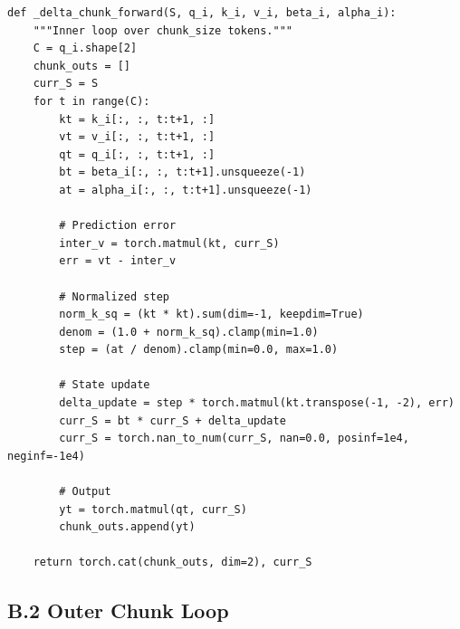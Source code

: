 \begin{lstlisting}
def _delta_chunk_forward(S, q_i, k_i, v_i, beta_i, alpha_i):
    """Inner loop over chunk_size tokens."""
    C = q_i.shape[2]
    chunk_outs = []
    curr_S = S
    for t in range(C):
        kt = k_i[:, :, t:t+1, :]
        vt = v_i[:, :, t:t+1, :]
        qt = q_i[:, :, t:t+1, :]
        bt = beta_i[:, :, t:t+1].unsqueeze(-1)
        at = alpha_i[:, :, t:t+1].unsqueeze(-1)
        
        # Prediction error
        inter_v = torch.matmul(kt, curr_S)
        err = vt - inter_v
        
        # Normalized step
        norm_k_sq = (kt * kt).sum(dim=-1, keepdim=True)
        denom = (1.0 + norm_k_sq).clamp(min=1.0)
        step = (at / denom).clamp(min=0.0, max=1.0)
        
        # State update
        delta_update = step * torch.matmul(kt.transpose(-1, -2), err)
        curr_S = bt * curr_S + delta_update
        curr_S = torch.nan_to_num(curr_S, nan=0.0, posinf=1e4, neginf=-1e4)
        
        # Output
        yt = torch.matmul(qt, curr_S)
        chunk_outs.append(yt)
    
    return torch.cat(chunk_outs, dim=2), curr_S
\end{lstlisting}

\subsection{B.2 Outer Chunk Loop}

